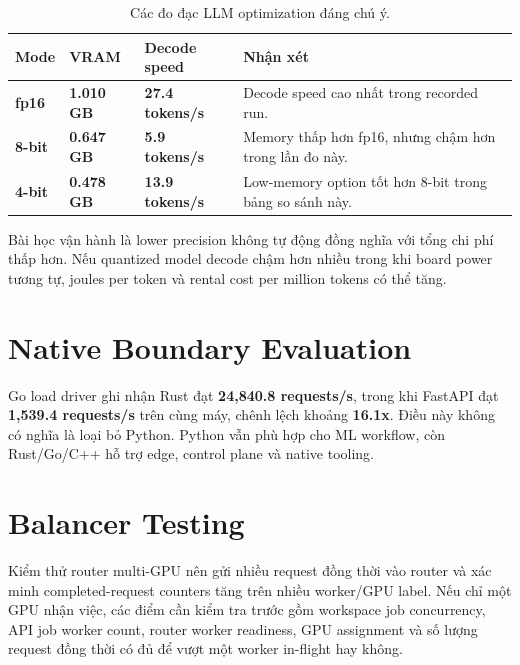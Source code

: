 \documentclass[12pt,a4paper,oneside]{report}
\newcommand{\code}[1]{\texttt{\detokenize{#1}}}
\newcommand{\metric}[2][TryOpsBlue]{\textbf{\color{#1}#2}}
\begin{document}
\begin{table}[H]
\centering
\caption{Các đo đạc LLM optimization đáng chú ý.}
\small
\begin{tabularx}{\linewidth}{>{\bfseries}p{2.2cm}p{3.1cm}p{3.1cm}X}
\toprule
\textbf{Mode} & \textbf{VRAM} & \textbf{Decode speed} & \textbf{Nhận xét} \\
\midrule
fp16 & \metric[TryOpsBlue]{1.010 GB} & \metric[TryOpsTeal]{27.4 tokens/s} & Decode speed cao nhất trong recorded run. \\
8-bit & \metric[TryOpsGold]{0.647 GB} & \metric[TryOpsRed]{5.9 tokens/s} & Memory thấp hơn fp16, nhưng chậm hơn trong lần đo này. \\
4-bit & \metric[TryOpsTeal]{0.478 GB} & \metric[TryOpsBlue]{13.9 tokens/s} & Low-memory option tốt hơn 8-bit trong bảng so sánh này. \\
\bottomrule
\end{tabularx}
\end{table}

Bài học vận hành là lower precision không tự động đồng nghĩa với tổng chi phí thấp hơn. Nếu quantized model decode chậm hơn nhiều trong khi board power tương tự, joules per token và rental cost per million tokens có thể tăng.

\section{Native Boundary Evaluation}

Go load driver ghi nhận Rust \code{/health} đạt \metric[TryOpsTeal]{24,840.8 requests/s}, trong khi FastAPI đạt \metric[TryOpsGold]{1,539.4 requests/s} trên cùng máy, chênh lệch khoảng \metric[TryOpsBlue]{16.1x}. Điều này không có nghĩa là loại bỏ Python. Python vẫn phù hợp cho ML workflow, còn Rust/Go/C++ hỗ trợ edge, control plane và native tooling.

\section{Balancer Testing}

Kiểm thử router multi-GPU nên gửi nhiều request đồng thời vào router và xác minh completed-request counters tăng trên nhiều worker/GPU label. Nếu chỉ một GPU nhận việc, các điểm cần kiểm tra trước gồm workspace job concurrency, API job worker count, router worker readiness, GPU assignment và số lượng request đồng thời có đủ để vượt một worker in-flight hay không.

\end{document}
